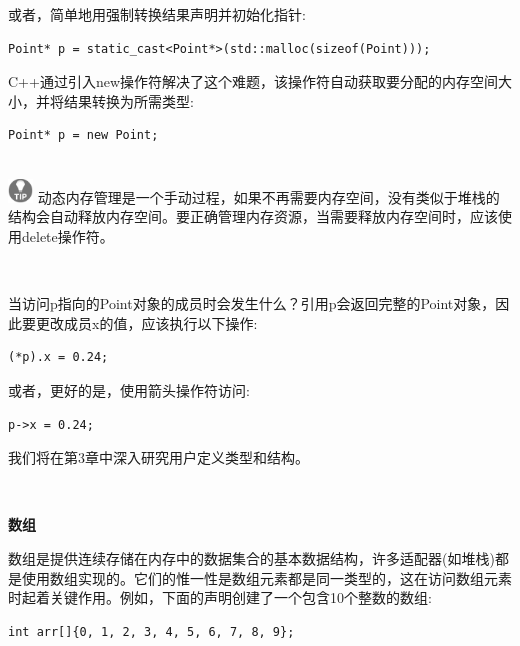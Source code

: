 或者，简单地用强制转换结果声明并初始化指针: \par

\begin{lstlisting}[caption={}]
Point* p = static_cast<Point*>(std::malloc(sizeof(Point)));
\end{lstlisting}

C++通过引入new操作符解决了这个难题，该操作符自动获取要分配的内存空间大小，并将结果转换为所需类型:\par

\begin{lstlisting}[caption={}]
Point* p = new Point;
\end{lstlisting}

\hspace*{\fill} \\ %
\includegraphics[width=0.05\textwidth]{images/tip}
动态内存管理是一个手动过程，如果不再需要内存空间，没有类似于堆栈的结构会自动释放内存空间。要正确管理内存资源，当需要释放内存空间时，应该使用delete操作符。 \par
\noindent\textbf{}\ \par

当访问p指向的Point对象的成员时会发生什么？引用p会返回完整的Point对象，因此要更改成员x的值，应该执行以下操作: \par

\begin{lstlisting}[caption={}]
(*p).x = 0.24;
\end{lstlisting}

或者，更好的是，使用箭头操作符访问: \par

\begin{lstlisting}[caption={}]
p->x = 0.24;
\end{lstlisting}

我们将在第3章中深入研究用户定义类型和结构。\par

\noindent\textbf{}\ \par
\textbf{数组} \ \par
数组是提供连续存储在内存中的数据集合的基本数据结构，许多适配器(如堆栈)都是使用数组实现的。它们的惟一性是数组元素都是同一类型的，这在访问数组元素时起着关键作用。例如，下面的声明创建了一个包含10个整数的数组: \par

\begin{lstlisting}[caption={}]
int arr[]{0, 1, 2, 3, 4, 5, 6, 7, 8, 9};
\end{lstlisting}

